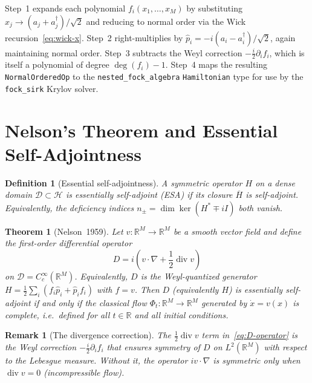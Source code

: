 \documentclass[11pt,a4paper]{article}
\newtheorem{theorem}{Theorem}
\newtheorem{definition}{Definition}
\newtheorem{remark}{Remark}
\newcommand{\Rset}{\mathbb{R}}
\newcommand{\Hil}{\mathcal{H}}
\newcommand{\Dom}{\mathcal{D}}
\begin{document}
Step~1 expands each polynomial $f_{i}(x_{1},\dots,x_{M})$ by
substituting $x_{j}\to(a_{j}+a_{j}^{\dagger})/\sqrt{2}$ and reducing to
normal order via the Wick recursion~\eqref{eq:wick-x}.  Step~2
right-multiplies by $\hat{p}_{i}=-i(a_{i}-a_{i}^{\dagger})/\sqrt{2}$,
again maintaining normal order.  Step~3 subtracts the Weyl correction
$-\tfrac{i}{2}\partial_{i}f_{i}$, which is itself a polynomial of degree
$\deg(f_{i})-1$.  Step~4 maps the resulting \texttt{NormalOrderedOp} to
the \texttt{nested\_fock\_algebra} \texttt{Hamiltonian} type for use by
the \texttt{fock\_sirk} Krylov solver.

\section{Nelson's Theorem and Essential
Self-Adjointness}\label{sec:nelson}

\begin{definition}[Essential self-adjointness]
A symmetric operator $H$ on a dense domain $\Dom\subset\Hil$ is
\emph{essentially self-adjoint} (ESA) if its closure $\overline{H}$ is
self-adjoint.  Equivalently, the deficiency indices
$n_{\pm}=\dim\ker(H^{*}\mp iI)$ both vanish.
\end{definition}

\begin{theorem}[Nelson~1959]\label{thm:nelson}
Let $v:\Rset^{M}\to\Rset^{M}$ be a smooth vector field and define the
first-order differential operator
\begin{equation}\label{eq:D-operator}
  D=i\!\left(v\cdot\nabla+\frac{1}{2}\operatorname{div}v\right)
\end{equation}
on $\Dom=C^{\infty}_{c}(\Rset^{M})$.  Equivalently, $D$ is the
Weyl-quantized generator
$H=\tfrac{1}{2}\sum_{i}(f_{i}\hat{p}_{i}+\hat{p}_{i}f_{i})$ with
$f=v$.  Then $D$ (equivalently $H$) is essentially self-adjoint if and
only if the classical flow
$\Phi_{t}:\Rset^{M}\to\Rset^{M}$ generated by $\dot{x}=v(x)$ is
\emph{complete}, i.e.\ defined for all $t\in\Rset$ and all initial
conditions.
\end{theorem}

\begin{remark}[The divergence correction]
The $\tfrac{1}{2}\operatorname{div}v$ term in~\eqref{eq:D-operator} is
the Weyl correction $-\tfrac{i}{2}\partial_{i}f_{i}$ that ensures
symmetry of $D$ on $L^{2}(\Rset^{M})$ with respect to the Lebesgue
measure.  Without it, the operator $iv\cdot\nabla$ is symmetric only
when $\operatorname{div}v=0$ (incompressible flow).
\end{remark}
\end{document}
